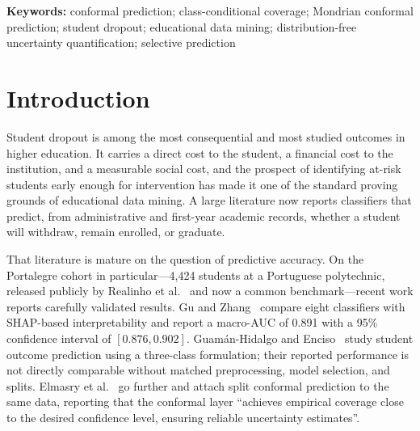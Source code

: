 \noindent\textbf{Keywords:} conformal prediction; class-conditional coverage;
Mondrian conformal prediction; student dropout; educational data mining;
distribution-free uncertainty quantification; selective prediction

\vspace{1em}

\section{Introduction}

Student dropout is among the most consequential and most studied outcomes in
higher education. It carries a direct cost to the student, a financial cost to
the institution, and a measurable social cost, and the prospect of identifying
at-risk students early enough for intervention has made it one of the standard
proving grounds of educational data mining. A large literature now reports
classifiers that predict, from administrative and first-year academic records,
whether a student will withdraw, remain enrolled, or graduate.

That literature is mature on the question of predictive accuracy. On the
Portalegre cohort in particular---4{,}424 students at a Portuguese polytechnic,
released publicly by Realinho et al.~\cite{realinho2022} and now a common
benchmark---recent work reports carefully validated results. Gu and
Zhang~\cite{gu2026} compare eight classifiers with SHAP-based interpretability
and report a macro-AUC of 0.891 with a 95\% confidence interval of
$[0.876, 0.902]$. Guamán-Hidalgo and Enciso~\cite{guaman2026} study student outcome
prediction using a three-class formulation; their reported performance is not
directly comparable without matched preprocessing, model selection, and splits. Elmasry et
al.~\cite{elmasry2026} go further and attach split conformal prediction to the
same data, reporting that the conformal layer ``achieves empirical coverage
close to the desired confidence level, ensuring reliable uncertainty
estimates''.

